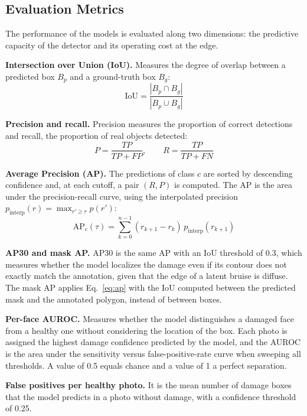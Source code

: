 \documentclass[journal]{IEEEtran}
\begin{document}
\subsection{Evaluation Metrics}\label{sec:metrics-theory}
The performance of the models is evaluated along two dimensions: the predictive capacity of the detector and its operating cost at the edge.

\textbf{Intersection over Union (IoU).} Measures the degree of overlap between a predicted box $B_p$ and a ground-truth box $B_g$:
\begin{equation}\label{eq:iou}
\mathrm{IoU} = \frac{|B_p \cap B_g|}{|B_p \cup B_g|}
\end{equation}

\textbf{Precision and recall.} Precision measures the proportion of correct detections and recall, the proportion of real objects detected:
\begin{equation}\label{eq:pr}
P = \frac{TP}{TP+FP}, \qquad R = \frac{TP}{TP+FN}
\end{equation}

\textbf{Average Precision (AP).} The predictions of class $c$ are sorted by descending confidence and, at each cutoff, a pair $(R,P)$ is computed. The AP is the area under the precision-recall curve, using the interpolated precision $p_{\mathrm{interp}}(r)=\max_{r'\ge r}p(r')$:
\begin{equation}\label{eq:ap}
\mathrm{AP}_c(\tau) = \sum_{k=0}^{n-1}(r_{k+1}-r_k)\,p_{\mathrm{interp}}(r_{k+1})
\end{equation}

\textbf{AP30 and mask AP.} AP30 is the same AP with an IoU threshold of 0.3, which measures whether the model localizes the damage even if its contour does not exactly match the annotation, given that the edge of a latent bruise is diffuse. The mask AP applies Eq.~\eqref{eq:ap} with the IoU computed between the predicted mask and the annotated polygon, instead of between boxes.

\textbf{Per-face AUROC.} Measures whether the model distinguishes a damaged face from a healthy one without considering the location of the box. Each photo is assigned the highest damage confidence predicted by the model, and the AUROC is the area under the sensitivity versus false-positive-rate curve when sweeping all thresholds. A value of 0.5 equals chance and a value of 1 a perfect separation.

\textbf{False positives per healthy photo.} It is the mean number of damage boxes that the model predicts in a photo without damage, with a confidence threshold of 0.25.
\end{document}
